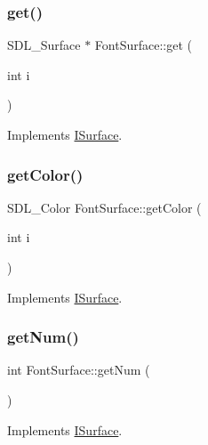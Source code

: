 \subsubsection{\texorpdfstring{get()}{get()}}
{\footnotesize\ttfamily S\+D\+L\+\_\+\+Surface $\ast$ Font\+Surface\+::get (\begin{DoxyParamCaption}\item[{int}]{i }\end{DoxyParamCaption})\hspace{0.3cm}{\ttfamily [virtual]}}



Implements \mbox{\hyperlink{class_i_surface_a45bacb1ffa6f0835e3ece0123b90c4fc}{I\+Surface}}.

\mbox{\label{class_font_surface_afe2bf10c79f421c252fe6a1477ee03dd}} 
\subsubsection{\texorpdfstring{get\+Color()}{getColor()}}
{\footnotesize\ttfamily S\+D\+L\+\_\+\+Color Font\+Surface\+::get\+Color (\begin{DoxyParamCaption}\item[{int}]{i }\end{DoxyParamCaption})\hspace{0.3cm}{\ttfamily [virtual]}}



Implements \mbox{\hyperlink{class_i_surface_adf609edb8f871bf37ed9aaf8fe0d2695}{I\+Surface}}.

\mbox{\label{class_font_surface_a432d08d23f82d9513332a579c91e1ee6}} 
\subsubsection{\texorpdfstring{get\+Num()}{getNum()}}
{\footnotesize\ttfamily int Font\+Surface\+::get\+Num (\begin{DoxyParamCaption}{ }\end{DoxyParamCaption})\hspace{0.3cm}{\ttfamily [virtual]}}



Implements \mbox{\hyperlink{class_i_surface_a1553f92deac310771e6fe63d62fc1d95}{I\+Surface}}.

